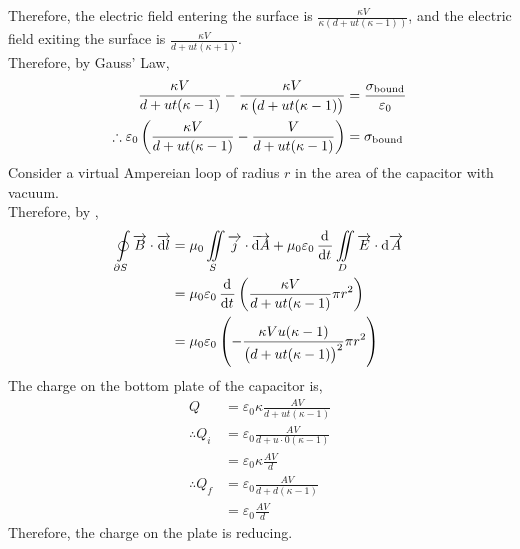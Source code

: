 \documentclass[fleqn, a4paper, 8pt, twoside]{amsart}
\theoremstyle{definition}
\theoremstyle{theorem}
\begin{document}
\begin{multicols}{2}
\begin{spacing}{0.6}
\begin{solution}
	Therefore, the electric field entering the surface is $\frac{\kappa V}{\kappa \left( d + u t (\kappa - 1) \right)}$, and the electric field exiting the surface is $\frac{\kappa V}{d + u t (\kappa + 1)}$.\\
	Therefore, by Gauss' Law,
	\begin{align*}
		\frac{\kappa V}{d + u t (\kappa - 1)} - \frac{\kappa V}{\kappa \left( d + u t (\kappa - 1) \right)} & = \frac{\sigma_{\textnormal{bound}}}{\varepsilon_0} \\
		\therefore \varepsilon_0 \left( \frac{\kappa V}{d + u t (\kappa - 1)} - \frac{V}{d + u t (\kappa - 1)} \right) &= \sigma_{\textnormal{bound}}
	\end{align*}
	Consider a virtual Ampereian loop of radius $r$ in the area of the capacitor with vacuum.\\
	Therefore, by ,
	\begin{align*}
		\oint\limits_{\partial S} \overrightarrow{B} \cdot \overrightarrow{\dif l} & = \mu_0 \iint\limits_{S} \overrightarrow{j} \cdot \overrightarrow{\dif A} + \mu_0 \varepsilon_0 \dod{}{t} \iint\limits_{D} \overrightarrow{E} \cdot \dif \overrightarrow{A} \\
                                                                                           & = \mu_0 \varepsilon_0 \dod{}{t}\left( \frac{\kappa V}{d + u t (\kappa - 1)} \pi r^2 \right)                                                                                 \\
                                                                                           & = \mu_0 \varepsilon_0 \left( -\frac{\kappa V u (\kappa - 1)}{\left( d + u t (\kappa - 1) \right)^2} \pi r^2 \right)
	\end{align*}
	The charge on the bottom plate of the capacitor is,
	\begin{align*}
		Q              & = \varepsilon_0 \kappa \frac{A V}{d + u t (\kappa - 1)} \\
		\therefore Q_i & = \varepsilon_0 \frac{A V}{d + u \cdot 0 (\kappa - 1)}  \\
                               & = \varepsilon_0 \kappa \frac{A V}{d}                    \\
		\therefore Q_f & = \varepsilon_0 \frac{A V}{d + d (\kappa - 1)}          \\
                               & = \varepsilon_0 \frac{A V}{d}
	\end{align*}
	Therefore, the charge on the plate is reducing.

\end{solution}
\end{spacing}
\end{multicols}
\end{document}
